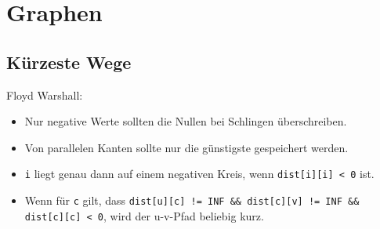 \section{Graphen}




\subsection{Kürzeste Wege}





% 
Floyd Warshall:
\begin{itemize}[nosep]
	\item Nur negative Werte sollten die Nullen bei Schlingen überschreiben.
	\item Von parallelen Kanten sollte nur die günstigste gespeichert werden.
	\item \lstinline{i} liegt genau dann auf einem negativen Kreis, wenn \lstinline{dist[i][i] < 0} ist.
	\item Wenn für \lstinline{c} gilt, dass \lstinline{dist[u][c] != INF && dist[c][v] != INF && dist[c][c] < 0}, wird der u-v-Pfad beliebig kurz.
\end{itemize}

